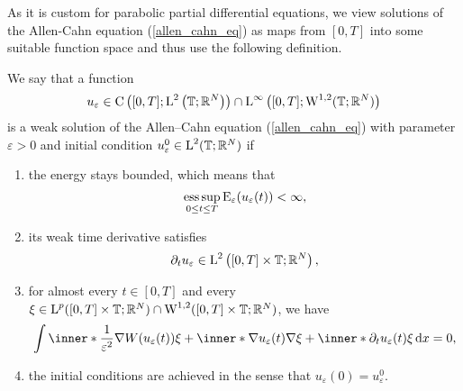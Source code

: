 As it is custom for parabolic partial differential equations, we view solutions 
of the Allen-Cahn equation (\ref{allen_cahn_eq}) as maps from $ [0,T] $ into 
some suitable function space and thus use the following definition.

\begin{definition}
	\label{solution_to_ac}
	We say that a function 
	\begin{equation*}
	u_{ \varepsilon} \in 
	\mathrm{ C } \left( [0 , T ] ; \operatorname{L}^{ 2 } \left( \operatorname{\mathbb{T}}; \mathbb{ R }^{ 
	N } \right) \right) \cap
	\operatorname{L}^{ \infty } \left( [0, T ]; \operatorname{W}^{ 1, 2 } ( \operatorname{\mathbb{T}} ; \mathbb{ R }^{ 
	N } ) \right)
	\end{equation*}
	is a weak solution of the Allen--Cahn equation (\ref{allen_cahn_eq}) with parameter $ \varepsilon > 0 $ and initial condition $ u_{ \varepsilon}^{ 0 } \in \operatorname{L}^{ 2 } ( \operatorname{\mathbb{T}} ; \mathbb{ R }^{ N } ) $ if
	\begin{enumerate}
		\item the energy stays bounded, which means that
		\begin{equation}
			\operatorname*{ess\,sup}_{ 0 \leq t \leq T }
			\operatorname{E}_{ \varepsilon } ( u_{ \varepsilon } ( t ) ) 
			< \infty,
		\end{equation}
		\item 
		its weak time derivative satisfies
		\begin{equation}
			\partial_{ t } u_{ \varepsilon }
			\in
			\operatorname{L}^{ 2 } \left( [ 0 , T ] \times \operatorname{\mathbb{T}} ; \mathbb{ R }^{ N } \right),
		\end{equation}
		\item 
		\label{here_appears_p}
		for almost every $ t \in [ 0 , T ] $ and every 
		$ \xi \in \operatorname{L}^{ p } ( [ 0 , T ] \times \operatorname{\mathbb{T}}; \mathbb{ R }^{ N } ) 
		\cap
		\operatorname{W}^{ 1, 2 } ( [ 0, T ] \times \operatorname{\mathbb{T}} ; \mathbb{ R }^{ N } ) $,
		we have
		\begin{equation}
			\label{ac_weak_equation}
			\int
			\inner*{ \frac{ 1 }{ \varepsilon^{ 2 } } \nabla W ( u_{ \varepsilon} ( t ) ) }{ \xi }
			+
			\inner*{ \nabla u_{ \varepsilon } ( t ) }{ \nabla \xi } 
			+
			\inner*{\partial_{ t } u_{ \varepsilon} ( t ) }{ \xi }
			\dd{x}
			=
			0,
		\end{equation}
		\item 
		the initial conditions are achieved in the sense that $ u_{ \varepsilon } ( 0 ) = u_{ \varepsilon}^{ 0 } $.
	\end{enumerate}
\end{definition}

